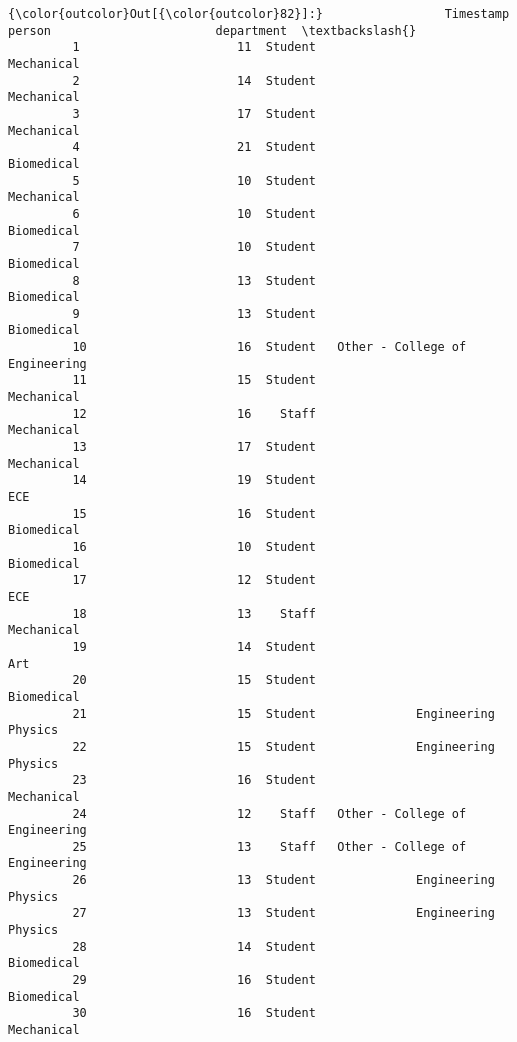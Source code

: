 \documentclass[11pt]{article}
\begin{document}
\begin{Verbatim}[commandchars=\\\{\}]
{\color{outcolor}Out[{\color{outcolor}82}]:}                 Timestamp   person                       department  \textbackslash{}
         1                      11  Student                       Mechanical   
         2                      14  Student                       Mechanical   
         3                      17  Student                       Mechanical   
         4                      21  Student                       Biomedical   
         5                      10  Student                       Mechanical   
         6                      10  Student                       Biomedical   
         7                      10  Student                       Biomedical   
         8                      13  Student                       Biomedical   
         9                      13  Student                       Biomedical   
         10                     16  Student   Other - College of Engineering   
         11                     15  Student                       Mechanical   
         12                     16    Staff                       Mechanical   
         13                     17  Student                       Mechanical   
         14                     19  Student                              ECE   
         15                     16  Student                       Biomedical   
         16                     10  Student                       Biomedical   
         17                     12  Student                              ECE   
         18                     13    Staff                       Mechanical   
         19                     14  Student                              Art   
         20                     15  Student                       Biomedical   
         21                     15  Student              Engineering Physics   
         22                     15  Student              Engineering Physics   
         23                     16  Student                       Mechanical   
         24                     12    Staff   Other - College of Engineering   
         25                     13    Staff   Other - College of Engineering   
         26                     13  Student              Engineering Physics   
         27                     13  Student              Engineering Physics   
         28                     14  Student                       Biomedical   
         29                     16  Student                       Biomedical   
         30                     16  Student                       Mechanical   

\end{Verbatim}
\end{document}
